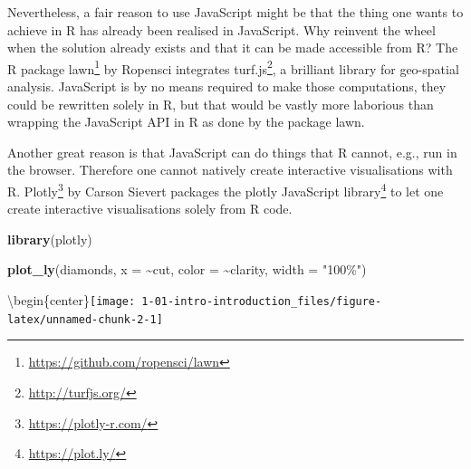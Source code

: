 \documentclass[
]{krantz}
\makeatletter
\newenvironment{Shaded}{\begin{snugshade}}{\end{snugshade}}
\newcommand{\CommentTok}[1]{\textcolor[rgb]{0.37,0.37,0.37}{\textit{#1}}}
\newcommand{\DataTypeTok}[1]{\textcolor[rgb]{0.27,0.27,0.27}{#1}}
\newcommand{\KeywordTok}[1]{\textcolor[rgb]{0.27,0.27,0.27}{\textbf{#1}}}
\newcommand{\NormalTok}[1]{#1}
\newcommand{\OperatorTok}[1]{\textcolor[rgb]{0.43,0.43,0.43}{\textbf{#1}}}
\newcommand{\StringTok}[1]{\textcolor[rgb]{0.5,0.5,0.5}{#1}}
\renewcommand{\href}[2]{#2\footnote{\url{#1}}}
\newenvironment{kframe}{%
\medskip{}
\setlength{\fboxsep}{.8em}
 \def\at@end@of@kframe{}%
 \ifinner\ifhmode%
  \def\at@end@of@kframe{\end{minipage}}%
  \begin{minipage}{\columnwidth}%
 \fi\fi%
 \def\FrameCommand##1{\hskip\@totalleftmargin \hskip-\fboxsep
 \colorbox{shadecolor}{##1}\hskip-\fboxsep
     \hskip-\linewidth \hskip-\@totalleftmargin \hskip\columnwidth}%
 \MakeFramed {\advance\hsize-\width
   \@totalleftmargin\z@ \linewidth\hsize
   \@setminipage}}%
 {\par\unskip\endMakeFramed%
 \at@end@of@kframe}
\renewenvironment{Shaded}{\begin{kframe}}{\end{kframe}}
\makeatother
\begin{document}
Nevertheless, a fair reason to use JavaScript might be that the thing one wants to achieve in R has already been realised in JavaScript. Why reinvent the wheel when the solution already exists and that it can be made accessible from R? The R package \href{https://github.com/ropensci/lawn}{lawn} \citep{R-lawn} by Ropensci integrates \href{http://turfjs.org/}{turf.js}, a brilliant library for geo-spatial analysis. JavaScript is by no means required to make those computations, they could be rewritten solely in R, but that would be vastly more laborious than wrapping the JavaScript API in R as done by the package lawn.

\begin{Shaded}
\end{Shaded}

Another great reason is that JavaScript can do things that R cannot, e.g., run in the browser. Therefore one cannot natively create interactive visualisations with R. \href{https://plotly-r.com/}{Plotly} \citep{R-plotly} by Carson Sievert packages the \href{https://plot.ly/}{plotly JavaScript library} to let one create interactive visualisations solely from R code.

\begin{Shaded}
\begin{Highlighting}[]
\KeywordTok{library}\NormalTok{(plotly)}

\KeywordTok{plot\_ly}\NormalTok{(diamonds, }\DataTypeTok{x =} \OperatorTok{\textasciitilde{}}\NormalTok{cut, }\DataTypeTok{color =} \OperatorTok{\textasciitilde{}}\NormalTok{clarity, }\DataTypeTok{width =} \StringTok{"100\%"}\NormalTok{)}
\end{Highlighting}
\end{Shaded}

\textbackslash begin\{center\}\texttt{[image: 1-01-intro-introduction\_files/figure-latex/unnamed-chunk-2-1]}
\end{document}
